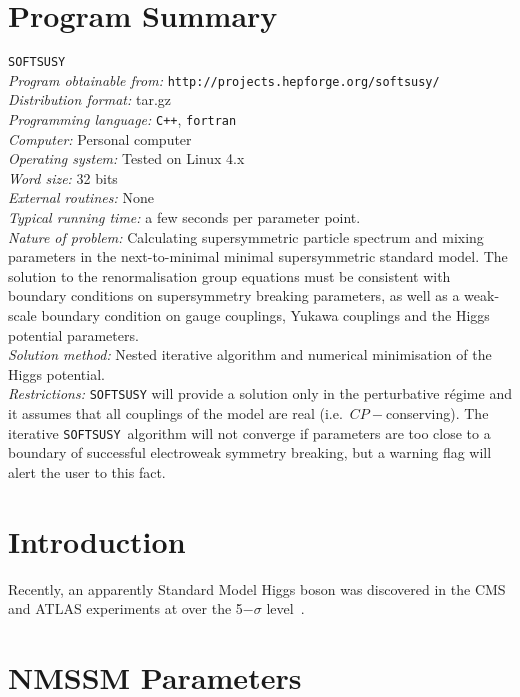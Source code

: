 \documentclass[final,3p,times,pdflatex]{elsarticle}
\def\SOFTSUSY{{\tt SOFTSUSY}}
\begin{document}
\section{Program Summary}
 \SOFTSUSY{}\\
{\em Program obtainable
  from:} {\tt http://projects.hepforge.org/softsusy/}\\
{\em Distribution format:}\/ tar.gz\\
{\em Programming language:} {\tt C++}, {\tt fortran}\\
{\em Computer:}\/ Personal computer\\
{\em Operating system:}\/ Tested on Linux 4.x\\
{\em Word size:}\/ 32 bits\\
{\em External routines:}\/ None\\
{\em Typical running time:}\/ a few seconds per parameter point.\\
{\em Nature of problem:}\/ Calculating supersymmetric particle spectrum and
mixing parameters in the next-to-minimal minimal supersymmetric standard
model. The solution to the renormalisation group equations must be consistent
with boundary conditions on supersymmetry breaking parameters, as
well as a weak-scale boundary condition on gauge 
couplings, Yukawa couplings and the Higgs potential parameters.\\
{\em Solution method:}\/ Nested iterative algorithm and numerical minimisation
of the Higgs potential. \\
{\em Restrictions:} {\SOFTSUSY} will provide a solution only in the
perturbative r\'{e}gime and it
assumes that all couplings of the model are real
(i.e.\ $CP-$conserving). The iterative \SOFTSUSY~algorithm will not 
converge if parameters are too close to a boundary of successful electroweak
symmetry breaking, but a warning flag will alert the user to this fact.

\newpage

\section{Introduction}

Recently, an apparently Standard Model Higgs boson was discovered in the CMS
and ATLAS experiments at over the 5$-\sigma$ level~\cite{}. 

\section{NMSSM Parameters \label{sec:notation}}
\end{document}
